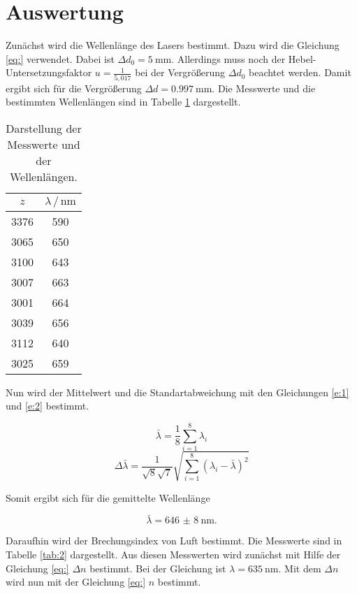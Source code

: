 \section{Auswertung}

Zunächst wird die Wellenlänge des Lasers bestimmt. Dazu wird die Gleichung
\ref{eq:} verwendet. Dabei ist $\Delta d_0 = \SI{5}{\milli\meter}$. Allerdings muss
noch der Hebel-Untersetzungsfaktor $u = \frac{1}{5,017}$ bei der Vergrößerung $\Delta d_0$
beachtet werden. Damit ergibt sich für die Vergrößerung $\Delta d = \SI{0.997}{\milli\meter}$.
Die Messwerte und die bestimmten Wellenlängen sind in Tabelle \ref{tab:1} dargestellt.

\begin{table}[H]
  \centering
  \caption{Darstellung der Messwerte und der Wellenlängen.}
  \label{tab:1}
  \begin{tabular}{c c}
    \toprule
    $z$ & $\lambda \, / \, \si{\nano\meter}$ \\
    \midrule
    3376 & 590 \\
    3065 & 650 \\
    3100 & 643 \\
    3007 & 663 \\
    3001 & 664 \\
    3039 & 656 \\
    3112 & 640 \\
    3025 & 659 \\
    \bottomrule
  \end{tabular}
\end{table}

Nun wird der Mittelwert und die Standartabweichung mit den Gleichungen \ref{e:1} und
\ref{e:2} bestimmt.


\begin{equation}
    \bar{\lambda} = \frac{1}{8} \sum_{i=1}^{8} \lambda_i
    \label{e:1}
\end{equation}
\begin{equation}
  \Delta \bar{\lambda} = \frac{1}{\sqrt{8}\sqrt{7}} \sqrt{\sum_{i=1}^{8}(\lambda_i-\bar{\lambda})^2}
  \label{e:2}
\end{equation}

Somit ergibt sich für die gemittelte Wellenlänge

\begin{equation*}
  \bar{\lambda} = \SI{646(8)}{\nano\meter}.
\end{equation*}

Daraufhin wird der Brechungsindex von Luft bestimmt. Die Messwerte sind in Tabelle
\ref{tab:2} dargestellt. Aus diesen Messwerten wird zunächst mit Hilfe der Gleichung
\ref{eq:} $\Delta n$ bestimmt. Bei der Gleichung ist $\lambda = \SI{635}{\nano\meter}$.
Mit dem $\Delta n$ wird nun mit der Gleichung \ref{eq:} $n$ bestimmt.

